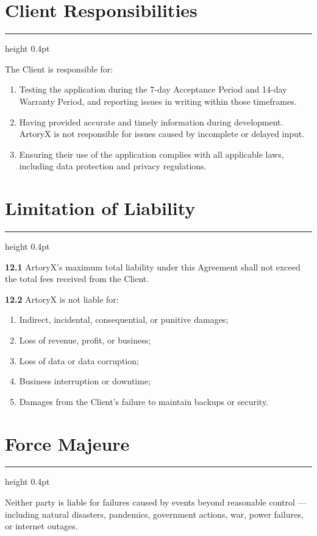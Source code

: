 \documentclass[a4paper, 11pt]{article}
\newcommand{\sectionrule}{%
  {\color{bordergray}\hrule height 0.4pt}%
  \vspace{5pt}%
}
\newcommand{\clausenum}[1]{%
  {\color{accent}\textbf{#1}}\;%
}
\begin{document}
\section{Client Responsibilities}
\sectionrule

{\small
The Client is responsible for:
\begin{enumerate}
  \item Testing the application during the 7-day Acceptance Period and 14-day Warranty Period, and reporting issues in writing within those timeframes.
  \item Having provided accurate and timely information during development. ArtoryX is not responsible for issues caused by incomplete or delayed input.
  \item Ensuring their use of the application complies with all applicable laws, including data protection and privacy regulations.
\end{enumerate}
}


\section{Limitation of Liability}
\sectionrule

{\small
\clausenum{12.1} ArtoryX's maximum total liability under this Agreement shall not exceed the total fees received from the Client.

\clausenum{12.2} ArtoryX is not liable for:
\begin{enumerate}
  \item Indirect, incidental, consequential, or punitive damages;
  \item Loss of revenue, profit, or business;
  \item Loss of data or data corruption;
  \item Business interruption or downtime;
  \item Damages from the Client's failure to maintain backups or security.
\end{enumerate}
}


\section{Force Majeure}
\sectionrule

{\small
Neither party is liable for failures caused by events beyond reasonable control --- including natural disasters, pandemics, government actions, war, power failures, or internet outages.
}
\end{document}
